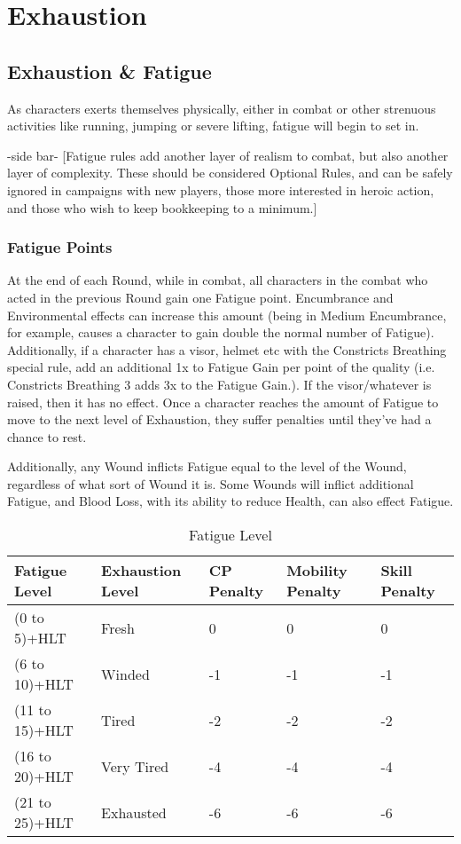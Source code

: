 \documentclass[oneside,11pt,english]{book}
\begin{document}
\section{\label{sec:exhaustion}Exhaustion}
\subsection{Exhaustion \& Fatigue}
As characters exerts themselves physically, either in combat or other strenuous activities like running, 
jumping or severe lifting, fatigue will begin to set in. 

-side bar- 
[Fatigue rules add another layer of realism to combat, but also another layer of complexity. These 
should be considered Optional Rules, and can be safely ignored in campaigns with new players, 
those more interested in heroic action, and those who wish to keep bookkeeping to a minimum.] 

\subsubsection{Fatigue Points}
At the end of each Round, while in combat, all characters in the combat who acted in the previous Round 
gain one Fatigue point. Encumbrance and Environmental effects can increase this amount (being in 
Medium Encumbrance, for example, causes a character to gain double the normal number of Fatigue). 
Additionally, if a character has a visor, helmet etc with the Constricts Breathing special rule, add an 
additional 1x to Fatigue Gain per point of the quality (i.e. Constricts Breathing 3 adds 3x to the Fatigue 
Gain.). If the visor/whatever is raised, then it has no effect. Once a character reaches the amount of 
Fatigue to move to the next level of Exhaustion, they suffer penalties until they’ve had a chance to rest. 

Additionally, any Wound inflicts Fatigue equal to the level of the Wound, regardless of what sort of 
Wound it is. Some Wounds will inflict additional Fatigue, and Blood Loss, with its ability to reduce 
Health, can also effect Fatigue. 

\begin{table}[hb]
	\centering
	\caption{Fatigue Level}
	\label{tab:Fatigue Level}
	\begin{tabu} spread 0pt {X X *{3}{X[-1,c]}}
Fatigue Level &Exhaustion Level &CP Penalty &Mobility Penalty &Skill Penalty\\\toprule
(0 to 5)+HLT &Fresh &0 &0 &0\\
(6 to 10)+HLT&Winded&-1 &-1 &-1\\
(11 to 15)+HLT &Tired &-2 &-2 &-2\\
(16 to 20)+HLT &Very Tired &-4 &-4 &-4\\
(21 to 25)+HLT &Exhausted &-6 &-6 &-6\\
	\end{tabu}
\end{table}
\end{document}
